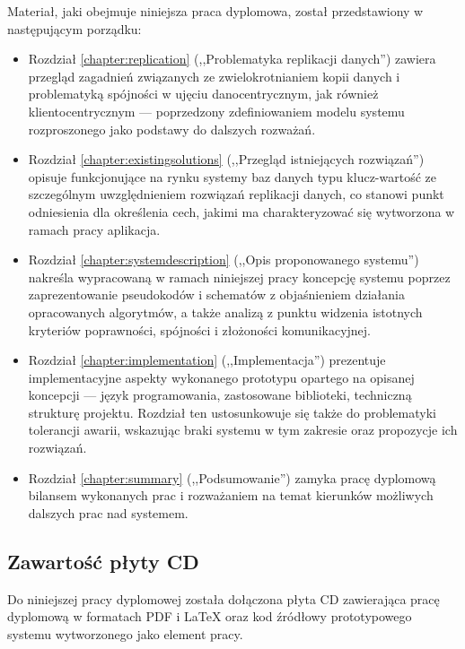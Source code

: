 Materiał, jaki obejmuje niniejsza praca dyplomowa, został przedstawiony w następującym porządku:
\begin{itemize}

\item Rozdział \ref{chapter:replication} (,,Problematyka replikacji danych'') zawiera przegląd zagadnień związanych ze zwielokrotnianiem kopii danych i problematyką spójności w ujęciu danocentrycznym, jak również klientocentrycznym --- poprzedzony zdefiniowaniem modelu systemu rozproszonego jako podstawy do dalszych rozważań.

\item Rozdział \ref{chapter:existingsolutions} (,,Przegląd istniejących rozwiązań'') opisuje funkcjonujące na rynku systemy baz danych typu klucz-wartość ze szczególnym uwzględnieniem rozwiązań replikacji danych, co stanowi punkt odniesienia dla określenia cech, jakimi ma charakteryzować się wytworzona w ramach pracy aplikacja.

\item Rozdział \ref{chapter:systemdescription} (,,Opis proponowanego systemu'') nakreśla wypracowaną w ramach niniejszej pracy koncepcję systemu poprzez zaprezentowanie pseudokodów i schematów z objaśnieniem działania opracowanych algorytmów, a także analizą z punktu widzenia istotnych kryteriów poprawności, spójności i złożoności komunikacyjnej.

\item Rozdział \ref{chapter:implementation} (,,Implementacja'') prezentuje implementacyjne aspekty wykonanego prototypu opartego na opisanej koncepcji --- język programowania, zastosowane biblioteki, techniczną strukturę projektu. Rozdział ten ustosunkowuje się także do problematyki tolerancji awarii, wskazując braki systemu w tym zakresie oraz propozycje ich rozwiązań.

\item Rozdział \ref{chapter:summary} (,,Podsumowanie'') zamyka pracę dyplomową bilansem wykonanych prac i rozważaniem na temat kierunków możliwych dalszych prac nad systemem.

\end{itemize}

\subsection*{Zawartość płyty CD}

Do niniejszej pracy dyplomowej została dołączona płyta CD zawierająca pracę dyplomową w formatach PDF i LaTeX oraz kod źródłowy prototypowego systemu wytworzonego jako element pracy.
